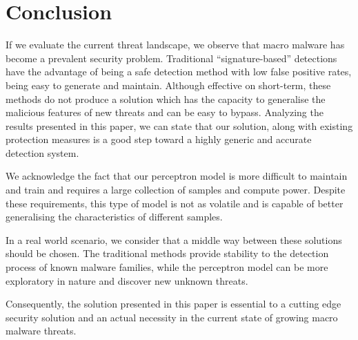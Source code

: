 \section{Conclusion}
\par
If we evaluate the current threat landscape, we observe that macro malware has become a prevalent security problem. 
Traditional “signature-based” detections have the advantage of being a safe detection method with low false positive rates, being easy to generate and maintain. Although effective on short-term, these methods do not produce a solution which has the capacity to generalise the malicious features of new threats and can be easy to bypass. Analyzing the results presented in this paper, we can state that our solution, along with existing protection measures is a good step toward a highly generic and accurate detection system. 
\par
We acknowledge the fact that our perceptron model is more difficult to maintain and train and requires a large collection of samples and compute power. Despite these requirements, this type of model is not as volatile and is capable of better generalising the characteristics of different samples.
\par
In a real world scenario, we consider that a middle way between these solutions should be chosen. The traditional methods provide stability to the detection process of known malware families, while the perceptron model can be more exploratory in nature and discover new unknown threats.
\par
Consequently, the solution presented in this paper is essential to a cutting edge security solution and an actual necessity in the current state of growing macro malware threats.

